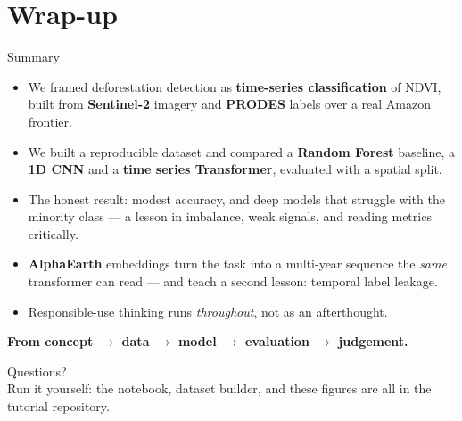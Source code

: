 \documentclass[aspectratio=169,11pt]{beamer}
\newcommand{\gtag}[1]{{\color{forestgreen}\textbf{#1}}}
\begin{document}
\section{Wrap-up}

\begin{frame}{Summary}
  \begin{itemize}
    \item We framed deforestation detection as \gtag{time-series
          classification} of NDVI, built from \textbf{Sentinel-2} imagery and
          \textbf{PRODES} labels over a real Amazon frontier.
    \item We built a reproducible dataset and compared a \textbf{Random
          Forest} baseline, a \textbf{1D CNN} and a \textbf{time series
          Transformer}, evaluated with a spatial split.
    \item The honest result: \alert{modest accuracy, and deep models that
          struggle with the minority class} — a lesson in imbalance, weak
          signals, and reading metrics critically.
    \item \textbf{AlphaEarth} embeddings turn the task into a multi-year
          sequence the \emph{same} transformer can read — and teach a second
          lesson: \alert{temporal label leakage}.
    \item Responsible-use thinking runs \emph{throughout}, not as an afterthought.
  \end{itemize}
  \vspace{0.5em}
  \centering
  \gtag{From concept $\to$ data $\to$ model $\to$ evaluation $\to$ judgement.}
\end{frame}

\begin{frame}[standout]
  Questions?\\[0.4em]
  \small\normalfont Run it yourself: the notebook, dataset builder, and these
  figures are all in the tutorial repository.
\end{frame}
\end{document}
